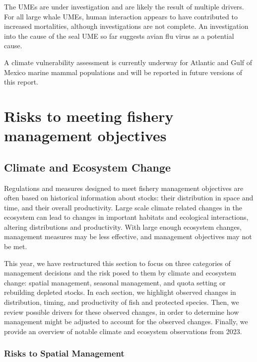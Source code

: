\documentclass[
  10pt,
]{article}
\begin{document}
The UMEs are under investigation and are likely the result of multiple drivers. For all large whale UMEs, human interaction appears to have contributed to increased mortalities, although investigations are not complete. An investigation into the cause of the seal UME so far suggests avian flu virus as a potential cause.

A climate vulnerability assessment is currently underway for Atlantic and Gulf of Mexico marine mammal populations and will be reported in future versions of this report.

\newpage

\hypertarget{risks-to-meeting-fishery-management-objectives}{%
\section{Risks to meeting fishery management objectives}\label{risks-to-meeting-fishery-management-objectives}}

\hypertarget{climate-and-ecosystem-change}{%
\subsection{Climate and Ecosystem Change}\label{climate-and-ecosystem-change}}

Regulations and measures designed to meet fishery management objectives are often based on historical information about stocks: their distribution in space and time, and their overall productivity. Large scale climate related changes in the ecosystem can lead to changes in important habitats and ecological interactions, altering distributions and productivity. With large enough ecosystem changes, management measures may be less effective, and management objectives may not be met.

This year, we have restructured this section to focus on three categories of management decisions and the risk posed to them by climate and ecosystem change: spatial management, seasonal management, and quota setting or rebuilding depleted stocks. In each section, we highlight observed changes in distribution, timing, and productivity of fish and protected species. Then, we review possible drivers for these observed changes, in order to determine how management might be adjusted to account for the observed changes. Finally, we provide an overview of notable climate and ecosystem observations from 2023.

\hypertarget{risks-to-spatial-management}{%
\subsubsection{Risks to Spatial Management}\label{risks-to-spatial-management}}
\end{document}
